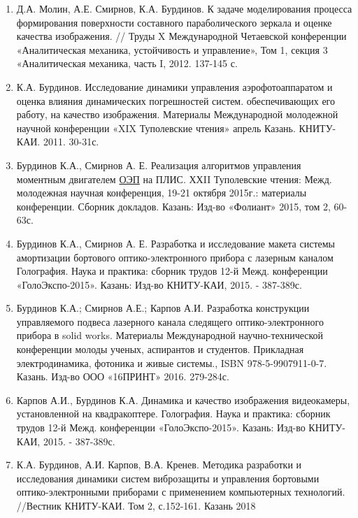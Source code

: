 \begin{enumerate}
  \item Д.А. Молин, А.Е. Смирнов, К.А. Бурдинов. К задаче моделирования процесса формирования поверхности составного параболического зеркала и оценке качества изображения. // Труды X Международной Четаевской конференции «Аналитическая механика, устойчивость и управление», Том 1, секция 3 «Аналитическая механика, часть I, 2012. 137-145 с.
  \item К.А. Бурдинов. Исследование динамики управления аэрофотоаппаратом и оценка влияния динамических погрешностей систем. обеспечивающих его работу, на качество изображения. Материалы Международной молодежной научной конференции «XIX Туполевские чтения» апрель Казань. КНИТУ- КАИ. 2011. 30-31с.
  \item Бурдинов К.А., Смирнов А. Е. Реализация алгоритмов управления моментным двигателем  \hyperref[acroEOS]{ОЭП} на ПЛИС. ХХII Туполевские чтения: Межд. молодежная научная конференция, 19-21 октября 2015г.: материалы конференции. Сборник докладов. Казань: Изд-во «Фолиант» 2015, том 2, 60-63с.
  \item Бурдинов К.А., Смирнов А. Е. Разработка и исследование макета системы амортизации бортового оптико-электронного прибора с лазерным каналом Голография. Наука и практика: сборник трудов 12-й Межд. конференции «ГолоЭкспо-2015». Казань: Изд-во КНИТУ-КАИ, 2015. - 387-389с.
  \item Бурдинов К.А.; Смирнов А.Е.; Карпов А.И. Разработка конструкции управляемого подвеса лазерного канала следящего оптико-электронного прибора в solid works. Материалы Международной научно-технической конференции молоды ученых, аспирантов и студентов. Прикладная электродинамика, фотоника и живые системы., ISBN 978-5-9907911-0-7. Казань. Изд-во ООО «16ПРИНТ» 2016. 279-284с.
  \item Карпов А.И., Бурдинов К.А. Динамика и качество изображения видеокамеры, установленной на квадракоптере. Голография. Наука и практика: сборник трудов 12-й Межд. конференции «ГолоЭкспо-2015». Казань: Изд-во КНИТУ-КАИ, 2015. - 387-389с.
  \item К.А. Бурдинов, А.И. Карпов, В.А. Кренев. Методика разработки и исследования динамики систем виброзащиты и управления бортовыми оптико-электронными приборами с применением компьютерных технологий. //Вестник КНИТУ-КАИ. Том 2, с.152-161. Казань 2018 
\end{enumerate}
